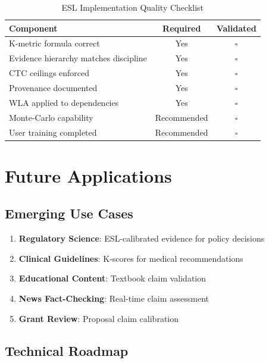 \documentclass[11pt,a4paper]{article}
\theoremstyle{remark}
\begin{document}
\begin{table}[h]
\centering
\caption{ESL Implementation Quality Checklist}
\label{tab:qa-checklist}
\begin{tabular}{lcc}
\toprule
\textbf{Component} & \textbf{Required} & \textbf{Validated} \\
\midrule
K-metric formula correct & Yes & $\square$ \\
Evidence hierarchy matches discipline & Yes & $\square$ \\
CTC ceilings enforced & Yes & $\square$ \\
Provenance documented & Yes & $\square$ \\
WLA applied to dependencies & Yes & $\square$ \\
Monte-Carlo capability & Recommended & $\square$ \\
User training completed & Recommended & $\square$ \\
\bottomrule
\end{tabular}
\end{table}

\section{Future Applications}
\label{sec:future}

\subsection{Emerging Use Cases}

\begin{enumerate}
    \item \textbf{Regulatory Science}: ESL-calibrated evidence for policy decisions
    \item \textbf{Clinical Guidelines}: K-scores for medical recommendations
    \item \textbf{Educational Content}: Textbook claim validation
    \item \textbf{News Fact-Checking}: Real-time claim assessment
    \item \textbf{Grant Review}: Proposal claim calibration
\end{enumerate}

\subsection{Technical Roadmap}
\end{document}

